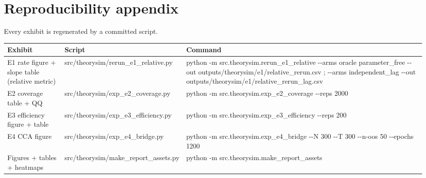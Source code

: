 \section*{Reproducibility appendix}
Every exhibit is regenerated by a committed script.

{\scriptsize\begin{longtable}{p{} p{} p{}}
\toprule Exhibit & Script & Command \\
\midrule
\endhead
E1 rate figure + slope table (relative metric) & {\tiny\ttfamily src/\allowbreak{}theorysim/\allowbreak{}rerun\_\allowbreak{}e1\_\allowbreak{}relative.\allowbreak{}py} & {\tiny\ttfamily python -\allowbreak{}m src.\allowbreak{}theorysim.\allowbreak{}rerun\_\allowbreak{}e1\_\allowbreak{}relative -\allowbreak{}-\allowbreak{}arms oracle parameter\_\allowbreak{}free -\allowbreak{}-\allowbreak{}out outputs/\allowbreak{}theorysim/\allowbreak{}e1/\allowbreak{}relative\_\allowbreak{}rerun.\allowbreak{}csv ; -\allowbreak{}-\allowbreak{}arms independent\_\allowbreak{}lag -\allowbreak{}-\allowbreak{}out outputs/\allowbreak{}theorysim/\allowbreak{}e1/\allowbreak{}relative\_\allowbreak{}rerun\_\allowbreak{}lag.\allowbreak{}csv} \\
E2 coverage table + QQ & {\tiny\ttfamily src/\allowbreak{}theorysim/\allowbreak{}exp\_\allowbreak{}e2\_\allowbreak{}coverage.\allowbreak{}py} & {\tiny\ttfamily python -\allowbreak{}m src.\allowbreak{}theorysim.\allowbreak{}exp\_\allowbreak{}e2\_\allowbreak{}coverage -\allowbreak{}-\allowbreak{}reps 2000} \\
E3 efficiency figure + table & {\tiny\ttfamily src/\allowbreak{}theorysim/\allowbreak{}exp\_\allowbreak{}e3\_\allowbreak{}efficiency.\allowbreak{}py} & {\tiny\ttfamily python -\allowbreak{}m src.\allowbreak{}theorysim.\allowbreak{}exp\_\allowbreak{}e3\_\allowbreak{}efficiency -\allowbreak{}-\allowbreak{}reps 200} \\
E4 CCA figure & {\tiny\ttfamily src/\allowbreak{}theorysim/\allowbreak{}exp\_\allowbreak{}e4\_\allowbreak{}bridge.\allowbreak{}py} & {\tiny\ttfamily python -\allowbreak{}m src.\allowbreak{}theorysim.\allowbreak{}exp\_\allowbreak{}e4\_\allowbreak{}bridge -\allowbreak{}-\allowbreak{}N 300 -\allowbreak{}-\allowbreak{}T 300 -\allowbreak{}-\allowbreak{}n-\allowbreak{}oos 50 -\allowbreak{}-\allowbreak{}epochs 1200} \\
Figures + tables + heatmaps & {\tiny\ttfamily src/\allowbreak{}theorysim/\allowbreak{}make\_\allowbreak{}report\_\allowbreak{}assets.\allowbreak{}py} & {\tiny\ttfamily python -\allowbreak{}m src.\allowbreak{}theorysim.\allowbreak{}make\_\allowbreak{}report\_\allowbreak{}assets} \\
\bottomrule
\end{longtable}}
